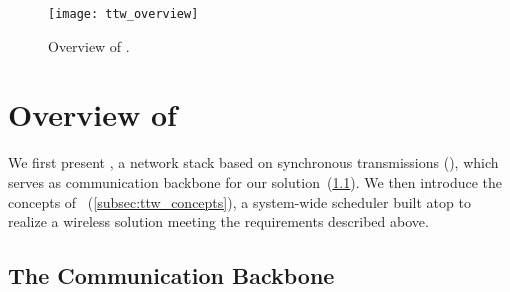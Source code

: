 
\begin{figure}
	\centering
	\texttt{[image: ttw\_overview]}
	\caption{Overview of \TTW.
	}
	\label{fig:ttw_overview}
\end{figure}



\section{Overview of \TTW}
\label{sec:ttw_overview}

We first present \TTnet, a network stack based on synchronous transmissions (\ST), which serves as communication backbone for our solution~(\cref{subsec:ttnet}). We then introduce the concepts of \TTW~(\cref{subsec:ttw_concepts}), a system-wide scheduler built atop \TTnet to realize a wireless \CPS solution meeting the requirements described above.

\subsection{The \TTnet Communication Backbone}
\label{subsec:ttnet}

